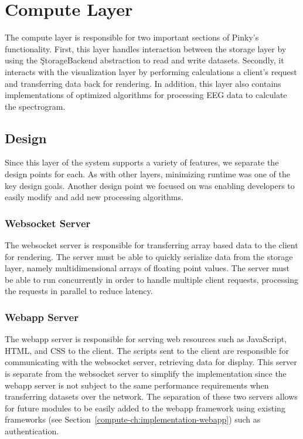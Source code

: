 \chapter{Compute Layer}\label{compute-ch}

The compute layer is responsible for two important sections of Pinky's
functionality. First, this layer handles interaction between the storage layer
by using the \c{StorageBackend} abstraction to read and write datasets.
Secondly, it interacts with the visualization layer by performing calculations a
client's request and transferring data back for rendering. In addition, this
layer also contains implementations of optimized algorithms for processing EEG
data to calculate the spectrogram.

\section{Design}

Since this layer of the system supports a variety of features, we separate the
design points for each. As with other layers, minimizing runtime was one of the
key design goals. Another design point we focused on was enabling developers to
easily modify and add new processing algorithms.

\subsection{Websocket Server}

The websocket server is responsible for transferring array based data to the
client for rendering. The server must be able to quickly serialize data from
the storage layer, namely multidimensional arrays of floating point values. The
server must be able to run concurrently in order to handle multiple client
requests, processing the requests in parallel to reduce latency.

\subsection{Webapp Server}

The webapp server is responsible for serving web resources such as JavaScript,
HTML, and CSS to the client. The scripts sent to the client are responsible for
communicating with the websocket server, retrieving data for display. This
server is separate from the websocket server to simplify the implementation
since the webapp server is not subject to the same performance requirements
when transferring datasets over the network. The separation of these two
servers allows for future modules to be easily added to the webapp framework
using existing frameworks (see Section~\ref{compute-ch:implementation-webapp})
such as authentication.

